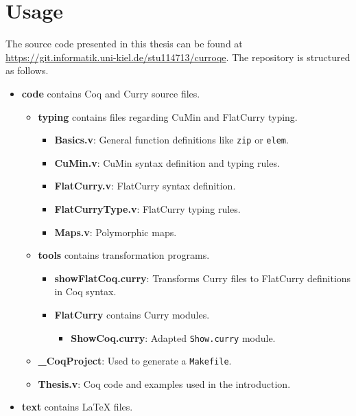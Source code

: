 \documentclass[paper = a4, fleqn, twoside]{scrreprt}
\begin{document}
\chapter{Usage}
\label{usage}
The source code presented in this thesis can be found at \url{https://git.informatik.uni-kiel.de/stu114713/curroqe}. The repository is structured as follows.
\begin{itemize}
	\item \textbf{code} contains Coq and Curry source files.
	\begin{itemize}
		\item \textbf{typing} contains files regarding CuMin and FlatCurry typing.
		\begin{itemize}
			\item \textbf{Basics.v}: General function definitions like \texttt{zip} or \texttt{elem}.
			\item \textbf{CuMin.v}: CuMin syntax definition and typing rules.
			\item \textbf{FlatCurry.v}: FlatCurry syntax definition.
			\item \textbf{FlatCurryType.v}: FlatCurry typing rules.
			\item \textbf{Maps.v}: Polymorphic maps.
		\end{itemize}
		\item \textbf{tools} contains transformation programs.
		\begin{itemize}
			\item \textbf{showFlatCoq.curry}: Transforms Curry files to FlatCurry definitions in Coq syntax.
			\item \textbf{FlatCurry} contains Curry modules.
			\begin{itemize}
				\item \textbf{ShowCoq.curry}: Adapted \texttt{Show.curry} module.
			\end{itemize}
		\end{itemize}
		\item \textbf{\_CoqProject}: Used to generate a \texttt{Makefile}.
		\item \textbf{Thesis.v}: Coq code and examples used in the introduction.
	\end{itemize}
	\item \textbf{text} contains \LaTeX{} files.
\end{itemize}
\end{document}
